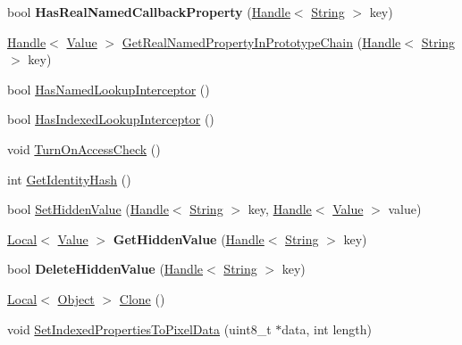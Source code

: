 \begin{DoxyCompactItemize}
\item 
\hypertarget{classv8_1_1_object_aa501acb241c3b3a941b9f48c23b1e1cd}{}bool {\bfseries Has\+Real\+Named\+Callback\+Property} (\hyperlink{classv8_1_1_handle}{Handle}$<$ \hyperlink{classv8_1_1_string}{String} $>$ key)\label{classv8_1_1_object_aa501acb241c3b3a941b9f48c23b1e1cd}

\item 
\hyperlink{classv8_1_1_handle}{Handle}$<$ \hyperlink{classv8_1_1_value}{Value} $>$ \hyperlink{classv8_1_1_object_abcede2bb76c86c5071314ffb340cf68c}{Get\+Real\+Named\+Property\+In\+Prototype\+Chain} (\hyperlink{classv8_1_1_handle}{Handle}$<$ \hyperlink{classv8_1_1_string}{String} $>$ key)
\item 
bool \hyperlink{classv8_1_1_object_a1e96fcb9ee17101c0299ec68f2cf8610}{Has\+Named\+Lookup\+Interceptor} ()
\item 
bool \hyperlink{classv8_1_1_object_a278913bcd203434870ce5184a538a9af}{Has\+Indexed\+Lookup\+Interceptor} ()
\item 
void \hyperlink{classv8_1_1_object_a6e9fe342c0f77995defa6b479d01a3bd}{Turn\+On\+Access\+Check} ()
\item 
int \hyperlink{classv8_1_1_object_ac1ece41e81a499920ec3a2a3471653bc}{Get\+Identity\+Hash} ()
\item 
bool \hyperlink{classv8_1_1_object_a2200482b09feb914dc91d8256671f7f0}{Set\+Hidden\+Value} (\hyperlink{classv8_1_1_handle}{Handle}$<$ \hyperlink{classv8_1_1_string}{String} $>$ key, \hyperlink{classv8_1_1_handle}{Handle}$<$ \hyperlink{classv8_1_1_value}{Value} $>$ value)
\item 
\hypertarget{classv8_1_1_object_a0fb148558e1749b04a2e13b2c9fa4441}{}\hyperlink{classv8_1_1_local}{Local}$<$ \hyperlink{classv8_1_1_value}{Value} $>$ {\bfseries Get\+Hidden\+Value} (\hyperlink{classv8_1_1_handle}{Handle}$<$ \hyperlink{classv8_1_1_string}{String} $>$ key)\label{classv8_1_1_object_a0fb148558e1749b04a2e13b2c9fa4441}

\item 
\hypertarget{classv8_1_1_object_ab1d274da1949b1f68087728760ee4172}{}bool {\bfseries Delete\+Hidden\+Value} (\hyperlink{classv8_1_1_handle}{Handle}$<$ \hyperlink{classv8_1_1_string}{String} $>$ key)\label{classv8_1_1_object_ab1d274da1949b1f68087728760ee4172}

\item 
\hyperlink{classv8_1_1_local}{Local}$<$ \hyperlink{classv8_1_1_object}{Object} $>$ \hyperlink{classv8_1_1_object_a5018c9d085aa71f65530cf1e073a04ad}{Clone} ()
\item 
void \hyperlink{classv8_1_1_object_a6c552c4817b9a0eff1fb12b7ef089026}{Set\+Indexed\+Properties\+To\+Pixel\+Data} (uint8\+\_\+t $\ast$data, int length)
\end{DoxyCompactItemize}
